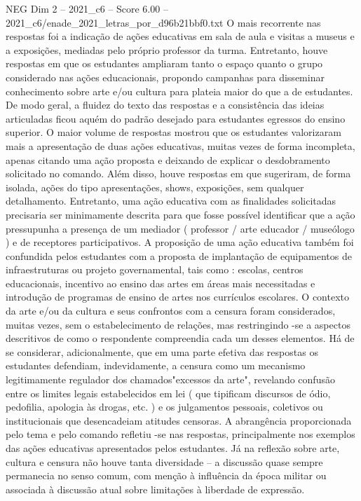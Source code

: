\begin{textsample}{NEG Dim 2 – 2021\_c6 – Score 6.00 – 2021\_c6/enade\_2021\_letras\_por\_d96b21bbf0.txt}
O mais recorrente nas respostas foi a indicação de ações educativas em sala de aula e visitas a museus e a exposições, mediadas pelo próprio professor da turma.
Entretanto, houve respostas em que os estudantes ampliaram tanto o espaço quanto o grupo considerado nas ações educacionais, propondo campanhas para disseminar conhecimento sobre arte e/ou cultura para plateia maior do que a de estudantes.
De modo geral, a fluidez do texto das respostas e a consistência das ideias articuladas ficou aquém do padrão desejado para estudantes egressos do ensino superior.
O maior volume de respostas mostrou que os estudantes valorizaram mais a apresentação de duas ações educativas, muitas vezes de forma incompleta, apenas citando uma ação proposta e deixando de explicar o desdobramento solicitado no comando.
Além disso, houve respostas em que sugeriram, de forma isolada, ações do tipo apresentações, shows, exposições, sem qualquer detalhamento.
Entretanto, uma ação educativa com as finalidades solicitadas precisaria ser minimamente descrita para que fosse possível identificar que a ação pressupunha a presença de um mediador ( professor / arte educador / museólogo ) e de receptores participativos.
A proposição de uma ação educativa também foi confundida pelos estudantes com a proposta de implantação de equipamentos de infraestruturas ou projeto governamental, tais como : escolas, centros educacionais, incentivo ao ensino das artes em áreas mais necessitadas e introdução de programas de ensino de artes nos currículos escolares.
O contexto da arte e/ou da cultura e seus confrontos com a censura foram considerados, muitas vezes, sem o estabelecimento de relações, mas restringindo -se a aspectos descritivos de como o respondente compreendia cada um desses elementos.
Há de se considerar, adicionalmente, que em uma parte efetiva das respostas os estudantes defendiam, indevidamente, a censura como um mecanismo legitimamente regulador dos chamados"excessos da arte", revelando confusão entre os limites legais estabelecidos em lei ( que tipificam discursos de ódio, pedofilia, apologia às drogas, etc. ) e os julgamentos pessoais, coletivos ou institucionais que desencadeiam atitudes censoras.
A abrangência proporcionada pelo tema e pelo comando refletiu -se nas respostas, principalmente nos exemplos das ações educativas apresentados pelos estudantes.
Já na reflexão sobre arte, cultura e censura não houve tanta diversidade – a discussão quase sempre permanecia no senso comum, com menção à influência da época militar ou associada à discussão atual sobre limitações à liberdade de expressão.

\end{textsample}
